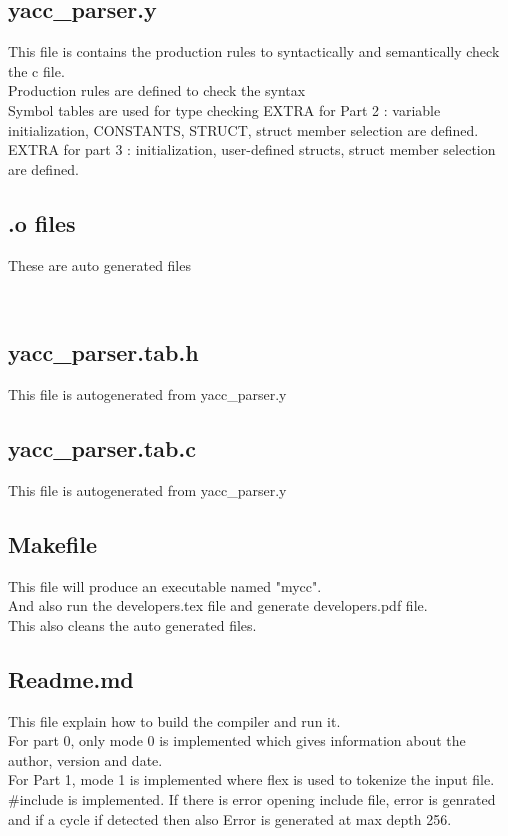 \documentclass{article}
\begin{document}
\subsection*{yacc\_parser.y}
This file is contains the production rules to syntactically and semantically check the c file. \\
Production rules are defined to check the syntax \\
Symbol tables are used for type checking
EXTRA for Part 2 : variable initialization, CONSTANTS, STRUCT, struct member selection are defined. \\
EXTRA for part 3 :  initialization,  user-defined structs, struct member selection are defined.\\

\subsection*{.o files}
These are auto generated files

\

\subsection*{yacc\_parser.tab.h}
This file is autogenerated from yacc\_parser.y \\

\subsection*{yacc\_parser.tab.c}
This file is autogenerated from yacc\_parser.y \\

\subsection*{Makefile}
This file will produce an executable named "mycc". \\
And also run the developers.tex file and generate developers.pdf file. \\
This also cleans the auto generated files. \\

\subsection*{Readme.md}
This file explain how to build the compiler and run it. \\
For part 0, only mode 0 is implemented which gives information about the author, version and date. \\
For Part 1,  mode 1 is implemented where flex is used to tokenize the input file. \\
$\#$include is implemented.
If there is error opening include file, error is genrated and if a cycle if detected then also Error is generated at max depth 256. \\
\end{document}
